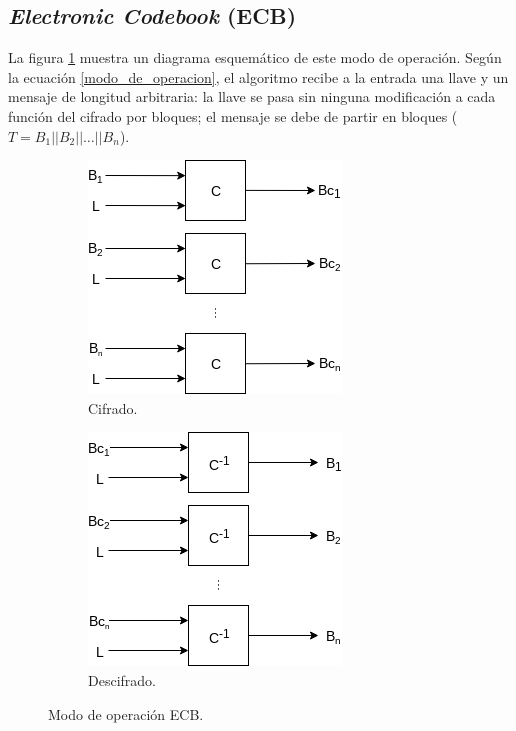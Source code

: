 \subsection{\textit{Electronic Codebook} (ECB)}

La figura \ref{figura:ecb} muestra un diagrama esquemático de este modo de
operación. Según la ecuación \ref{modo_de_operacion}, el algoritmo recibe a la
entrada una llave y un mensaje de longitud arbitraria: la llave se pasa
sin ninguna modificación a cada función del cifrado por bloques; el mensaje
se debe de partir en bloques ($ T = B_1 || B_2 || \dots || B_n $).

\begin{figure}[H]
  \centering
  \begin{subfigure}{0.45\textwidth}
      \begin{center}
          \includegraphics[width=0.7\linewidth]
            {contenidos/antecedentes/diagramas/modo_ecb.png}
          \caption{Cifrado.}
      \end{center}
  \end{subfigure}
  \begin{subfigure}{0.45\textwidth}
      \begin{center}
          \includegraphics[width=0.7\linewidth]
            {contenidos/antecedentes/diagramas/modo_ecb_inverso.png}
          \caption{Descifrado.}
      \end{center}
  \end{subfigure}
  \caption{Modo de operación ECB.}
  \label{figura:ecb}
\end{figure}


